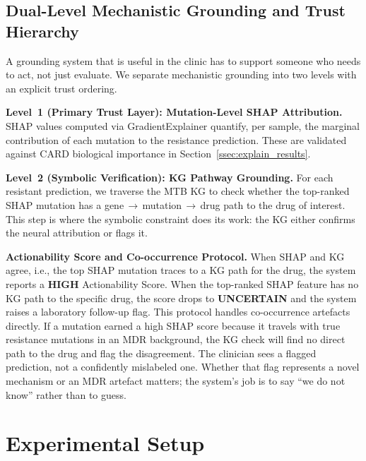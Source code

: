 \documentclass[conference]{IEEEtran}
\begin{document}
\subsection{Dual-Level Mechanistic Grounding and Trust Hierarchy}

A grounding system that is useful in the clinic has to support someone who needs to act, not just evaluate. We separate mechanistic grounding into two levels with an explicit trust ordering.

\smallskip\noindent\textbf{Level~1 (Primary Trust Layer): Mutation-Level SHAP Attribution.}
SHAP values computed via GradientExplainer quantify, per sample, the marginal contribution of each mutation to the resistance prediction. These are validated against CARD biological importance in Section~\ref{ssec:explain_results}.

\smallskip\noindent\textbf{Level~2 (Symbolic Verification): KG Pathway Grounding.}
For each resistant prediction, we traverse the MTB KG to check whether the top-ranked SHAP mutation has a gene\,$\to$\,mutation\,$\to$\,drug path to the drug of interest. This step is where the symbolic constraint does its work: the KG either confirms the neural attribution or flags it.

\smallskip\noindent\textbf{Actionability Score and Co-occurrence Protocol.}
When SHAP and KG agree, i.e., the top SHAP mutation traces to a KG path for the drug, the system reports a \textbf{HIGH} Actionability Score. When the top-ranked SHAP feature has no KG path to the specific drug, the score drops to \textbf{UNCERTAIN} and the system raises a laboratory follow-up flag. This protocol handles co-occurrence artefacts directly. If a mutation earned a high SHAP score because it travels with true resistance mutations in an MDR background, the KG check will find no direct path to the drug and flag the disagreement. The clinician sees a flagged prediction, not a confidently mislabeled one. Whether that flag represents a novel mechanism or an MDR artefact matters; the system's job is to say ``we do not know'' rather than to guess.

\section{Experimental Setup} \label{sec:exp}
\end{document}
